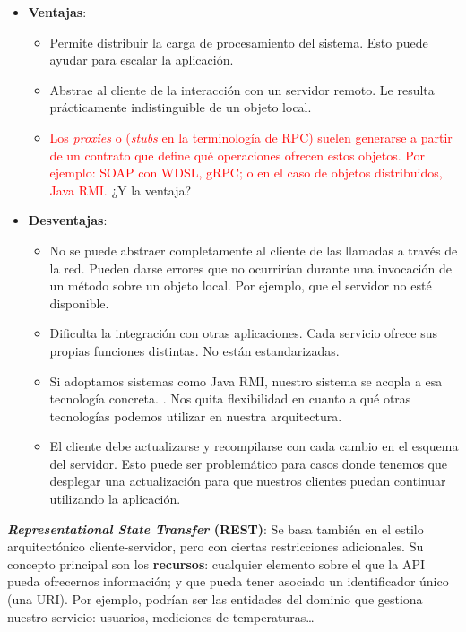 \begin{itemize}
  \item \textbf{Ventajas}:
  \begin{itemize}
    \item Permite distribuir la carga de procesamiento del sistema. Esto puede ayudar para escalar la aplicación.

    \item Abstrae al cliente de la interacción con un servidor remoto. Le resulta prácticamente indistinguible de un objeto local.

    \item \textcolor{red}{Los \emph{proxies} o (\emph{stubs} en la terminología de RPC) suelen generarse a partir de un contrato que define qué operaciones ofrecen estos objetos. Por ejemplo: SOAP con WDSL, gRPC; o en el caso de objetos distribuidos, Java RMI.} ¿Y la ventaja?
  \end{itemize}

  \item \textbf{Desventajas}:
  \begin{itemize}
    \item No se puede abstraer completamente al cliente de las llamadas a través de la red. Pueden darse errores que no ocurrirían durante una invocación de un método sobre un objeto local. Por ejemplo, que el servidor no esté disponible. \cite{jausovecFallaciesDistributedSystems2020}

    \item Dificulta la integración con otras aplicaciones. Cada servicio ofrece sus propias funciones distintas. No están estandarizadas.

    \item Si adoptamos sistemas como Java RMI, nuestro sistema se acopla a esa tecnología concreta. \cite{newmanBuildingMicroservicesDesigning2021}. Nos quita flexibilidad en cuanto a qué otras tecnologías podemos utilizar en nuestra arquitectura.

    \item El cliente debe actualizarse y recompilarse con cada cambio en el esquema del servidor. Esto puede ser problemático para casos donde tenemos que desplegar una actualización para que nuestros clientes puedan continuar utilizando la aplicación.
  \end{itemize}
\end{itemize}

\textbf{\emph{Representational State Transfer} (REST)}: Se basa también en el estilo arquitectónico cliente-servidor, pero con ciertas restricciones adicionales. \cite{taylorSoftwareArchitectureFoundations2009} Su concepto principal son los \textbf{recursos}: cualquier elemento sobre el que la API pueda ofrecernos información; y que pueda tener asociado un identificador único (una URI). \cite{richardsonRESTfulWebServices2007} Por ejemplo, podrían ser las entidades del dominio que gestiona nuestro servicio: usuarios, mediciones de temperaturas\dots

